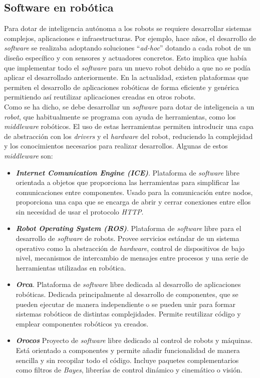 \subsection{Software en robótica}
\label{subsec:softwarerobot}
Para dotar de inteligencia autónoma a los robots se requiere desarrollar sistemas  complejos, aplicaciones e infraestructuras. Por ejemplo, hace años, el desarrollo de \textit{software} se realizaba adoptando soluciones ``\textit{ad-hoc}'' dotando a cada robot de un diseño específico y con sensores y actuadores concretos. Esto implica que había que implementar todo el \textit{software} para un nuevo robot debido a que no se podía aplicar el desarrollado anteriormente. En la actualidad, existen plataformas que permiten el desarrollo de aplicaciones robóticas de forma eficiente y genérica permitiendo así reutilizar aplicaciones creadas en otros robots. \\  


Como se ha dicho, se debe desarrollar un \textit{software} para dotar de inteligencia a un \textit{robot}, que habitualmente se programa con ayuda de herramientas, como los \textit{middleware} robóticos. El uso de estas herramientas permiten introducir una capa de abstracción con los \textit{drivers} y el \textit{hardware} del robot, reduciendo la complejidad y los conocimientos necesarios para realizar desarrollos. Algunas de estos \textit{middleware} son: 
\begin{itemize}
    \item  \textit{\textbf{Internet Comunication Engine (ICE)}}\cite{bib:ice}. Plataforma de \textit{software} libre orientada a objetos que proporciona las herramientas para simplificar las comunicaciones entre componentes. Usado para la comunicación entre nodos, proporciona una capa que se encarga de abrir y cerrar conexiones entre ellos sin necesidad de usar el protocolo \textit{HTTP}. 
    \item \textit{\textbf{Robot Operating System (ROS)}}\cite{bib:ros}. Plataforma de \textit{software} libre para el desarrollo de \textit{software} de robots. Provee servicios estándar de un sistema operativo como la abstracción de \textit{hardware}, control de dispositivos de bajo nivel, mecanismos de intercambio de mensajes entre procesos y una serie de herramientas utilizadas en robótica. 
    \item \textit{\textbf{Orca}}\cite{bib:orca}. Plataforma de \textit{software} libre dedicada al desarrollo de aplicaciones robóticas. Dedicada principalmente al desarrollo de componentes, que se pueden ejecutar de manera independiente o se pueden unir para formar sistemas robóticos de distintas complejidades. Permite reutilizar código y emplear componentes robóticos ya creados.
     \item \textit{\textbf{Orocos}}\cite{bib:orocos} Proyecto de \textit{software} libre dedicado al control de robots y máquinas. Está orientado a componentes y permite añadir funcionalidad de manera sencilla y sin recopilar todo el código. Incluye paquetes complementarios como filtros de \textit{Bayes}, librerías de control dinámico y cinemático o visión.
\end{itemize}

